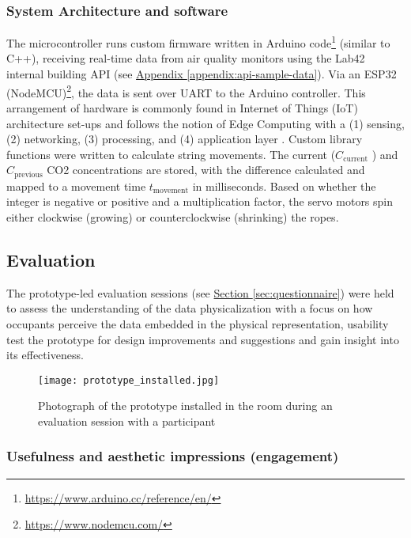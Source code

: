 \subsubsection{System Architecture and software}

The microcontroller runs custom firmware written in Arduino code\footnote{\url{https://www.arduino.cc/reference/en/}} (similar to C++), receiving real-time data from air quality monitors using the Lab42 internal building API (see \hyperref[appendix:api-sample-data]{Appendix \ref*{appendix:api-sample-data}}). Via an ESP32 (NodeMCU)\footnote{\url{https://www.nodemcu.com/}}, the data is sent over UART to the Arduino controller. This arrangement of hardware is commonly found in Internet of Things (IoT) architecture set-ups and follows the notion of Edge Computing with a (1) sensing, (2) networking, (3) processing, and (4) application layer \cite{li_edge-oriented_2019, idrees_edge_2018}. Custom library functions were written to calculate string movements. The current (\( C_{\text{current}} \) ) and \( C_{\text{previous}} \) CO2 concentrations are stored, with the difference calculated and mapped to a movement time \( t_{\text{movement}} \) in milliseconds. Based on whether the integer is negative or positive and a multiplication factor, the servo motors spin either clockwise (growing) or counterclockwise (shrinking) the ropes.


\subsection{Evaluation}
\label{sec:evaluation_results}

The prototype-led evaluation sessions (see \hyperref[sec:questionnaire]{Section \ref*{sec:questionnaire}}) were held to assess the understanding of the data physicalization with a focus on how occupants perceive the data embedded in the physical representation, usability test the prototype for design improvements and suggestions and gain insight into its effectiveness.

\begin{figure}[b]
    \centering
    \texttt{[image: prototype\_installed.jpg]}
    \caption{Photograph of the prototype installed in the room during an evaluation session with a participant }
    \label{fig:photograph-prototype}
\end{figure}

\subsubsection{Usefulness and aesthetic impressions (engagement)}

